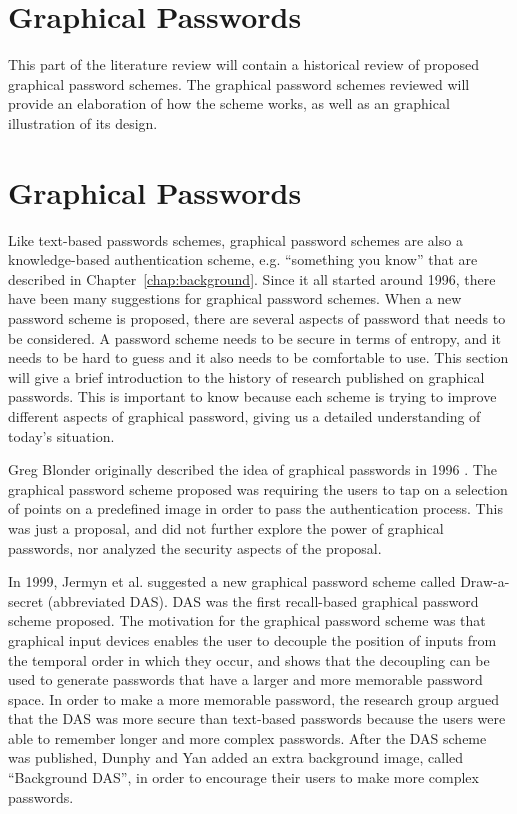 \section{Graphical Passwords}
\label{chapter:literatureReview}

This part of the literature review will contain a historical review of proposed graphical password schemes. The graphical password schemes reviewed will provide an elaboration of how the scheme works, as well as an graphical illustration of its design. 

\section*{Graphical Passwords} \label{sec:literaturegraphicalPasswords}

  Like text-based passwords schemes, graphical password schemes are also a knowledge-based authentication scheme, e.g. ``something you know'' that are described in Chapter~\ref{chap:background}. Since it all started around 1996, there have been many suggestions for graphical password schemes. When a new password scheme is proposed, there are several aspects of password that needs to be considered. A password scheme needs to be secure in terms of entropy, and it needs to be hard to guess and it also needs to be comfortable to use. This section will give a brief introduction to the history of research published on graphical passwords. This is important to know because each scheme is trying to improve different aspects of graphical password, giving us a detailed understanding of today's situation.

  Greg Blonder originally described the idea of graphical passwords in 1996 \cite{Blonder}. The graphical password scheme proposed was requiring the users to tap on a selection of points on a predefined image in order to pass the authentication process. This was just a proposal, and did not further explore the power of graphical passwords, nor analyzed the security aspects of the proposal.

  In 1999, Jermyn et al. \cite{Jermyn} suggested a new graphical password scheme called Draw-a-secret (abbreviated DAS). DAS was the first recall-based graphical password scheme proposed. The motivation for the graphical password scheme was that graphical input devices enables the user to decouple the position of inputs from the temporal order in which they occur, and shows that the decoupling can be used to generate passwords that have a larger and more memorable password space. In order to make a more memorable password, the research group argued that the DAS was more secure than text-based passwords because the users were able to remember longer and more complex passwords. After the DAS scheme was published, Dunphy and Yan \cite{BDAS} added an extra background image, called ``Background DAS'', in order to encourage their users to make more complex passwords. 

